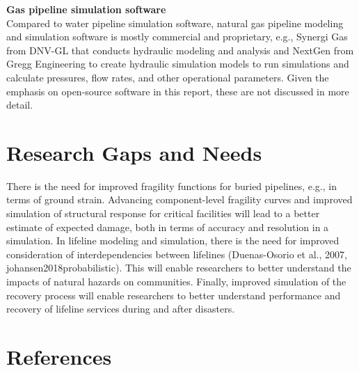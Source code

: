 \noindent\textbf{Gas pipeline simulation software} \\Compared to water pipeline simulation software, natural gas pipeline modeling and simulation software is mostly commercial and proprietary, e.g., Synergi Gas from DNV-GL that conducts hydraulic modeling and analysis and NextGen from Gregg Engineering to create hydraulic simulation models to run simulations and calculate pressures, flow rates, and other operational parameters. Given the emphasis on open-source software in this report, these are not discussed in more detail.

\section{Research Gaps and Needs}
\label{sec:perf_pipeline_gaps}

There is the need for improved fragility functions for buried pipelines, e.g., in terms of ground strain. Advancing component-level fragility curves and improved simulation of structural response for critical facilities will lead to a better estimate of expected damage, both in terms of accuracy and resolution in a simulation. In lifeline modeling and simulation, there is the need for improved consideration of interdependencies between lifelines (Duenas-Osorio et al., 2007, johansen2018probabilistic). This will enable researchers to better understand the impacts of natural hazards on communities. Finally, improved simulation of the recovery process \citep{tabucchi2010simulation, he2019disaster, tomar2020hindcasting} will enable researchers to better understand performance and recovery of lifeline services during and after disasters.

\section{References}





